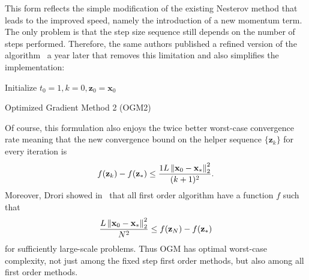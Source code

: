 This form reflects the simple modification of the existing Nesterov method that leads to the improved speed, namely the introduction of a new momentum term. The only problem is that the step size sequence still depends on the number of steps performed. Therefore, the same authors published a refined version of the algorithm~\cite{kim_convergence_2017} a year later that removes this limitation and also simplifies the implementation:

\begin{algorithm}[H]
    \BlankLine
    Initialize $t_0 = 1, k = 0, \mathbf{z}_0 = \mathbf{x}_0$\\
    \caption{Optimized Gradient Method 2 (OGM2)}
\end{algorithm}

Of course, this formulation also enjoys the twice better worst-case convergence rate meaning that the new convergence bound on the helper sequence $\{\mathbf{z}_k\}$ for every iteration is
\[f(\mathbf{z}_k) - f(\mathbf{z}_*) \le \frac{1L\left\lVert\mathbf{x}_0 - \mathbf{x}_*\right\rVert_2^2}{(k+1)^2}.\]
Moreover, Drori showed in~\cite{drori_exact_2017} that all first order algorithm have a function $f$ such that
\[\frac{L\left\lVert\mathbf{x}_0 - \mathbf{x}_*\right\rVert_2^2}{N^2} \le f(\mathbf{z}_N) - f(\mathbf{z}_*)\]
for sufficiently large-scale problems. Thus OGM has optimal worst-case complexity, not just among the fixed step first order methods, but also among all first order methods.

